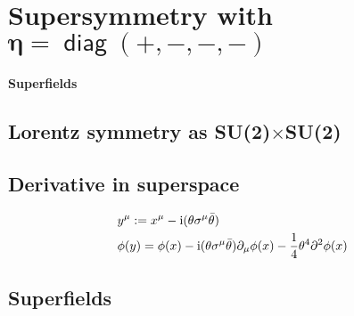 \documentclass[CheatSheet]{subfiles}
\begin{document}
\summarystyle
\section[Supersymmetry with $\eta=\diag(+,-,-,-)$]{Supersymmetry with $\bm{\eta=\mathop{\mathsf{diag}}(+,-,-,-)}$}



\paragraph{Superfields}


\clearpage
\detailstyle

\subsection{Lorentz symmetry as SU(2)$\times$SU(2)}

\subsection{Derivative in superspace}

\begin{align}&
y^\mu := x^\mu - \mathrm{i}(\theta\sigma^{\mu}\bar\theta)
\\&
\phi(y)=\phi(x)-\mathrm{i} (\theta \sigma^{\mu}\bar\theta) \partial_{\mu}\phi(x)-\frac{1}{4} \theta^4 \partial^2\phi(x)
\end{align}

\subsection{Superfields}
\end{document}
